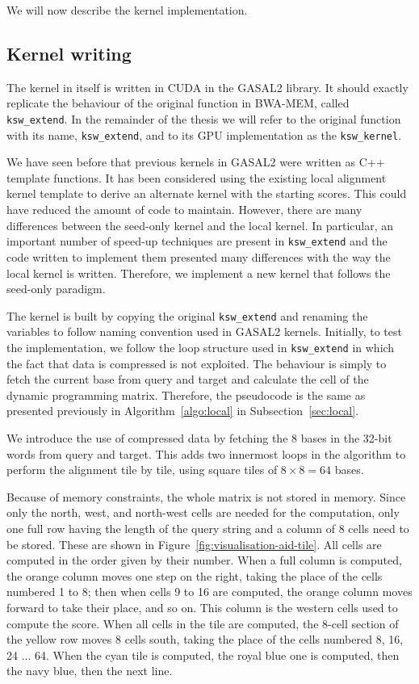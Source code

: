 We will now describe the kernel implementation.

\subsection{Kernel writing}
The kernel in itself is written in CUDA in the GASAL2 library. It should exactly replicate the behaviour of the original function in BWA-MEM, called \verb|ksw_extend|. In the remainder of the thesis we will refer to the original function with its name, \verb|ksw_extend|, and to its GPU implementation as the \verb|ksw_kernel|.

We have seen before that previous kernels in GASAL2 were written as C++ template functions. It has been considered using the existing local alignment kernel template to derive an alternate kernel with the starting scores. This could have reduced the amount of code to maintain. However, there are many differences between the seed-only kernel and the local kernel. In particular, an important number of speed-up techniques are present in \verb|ksw_extend| and the code written to implement them presented many differences with the way the local kernel is written. Therefore, we implement a new kernel that follows the seed-only paradigm.

The kernel is built by copying the original \verb|ksw_extend| and renaming the variables to follow naming convention used in GASAL2 kernels. Initially, to test the implementation, we follow the loop structure used in \verb|ksw_extend| in which the fact that data is compressed is not exploited. The behaviour is simply to fetch the current base from query and target and calculate the cell of the dynamic programming matrix. Therefore, the pseudocode is the same as presented previously in Algorithm~\ref{algo:local} in Subsection~\ref{sec:local}.

We introduce the use of compressed data by fetching the 8 bases in the 32-bit words from query and target. This adds two innermost loops in the algorithm to perform the alignment tile by tile, using square tiles of $8 \times 8 = 64$ bases.

Because of memory constraints, the whole matrix is not stored in memory. Since only the north, west, and north-west cells are needed for the computation, only one full row having the length of the query string and a column of 8 cells need to be stored. These are shown in Figure~\ref{fig:visualisation-aid-tile}. All cells are computed in the order given by their number. When a full column is computed, the orange column moves one step on the right, taking the place of the cells numbered 1 to 8; then when cells 9 to 16 are computed, the orange column moves forward to take their place, and so on. This column is the western cells used to compute the score. When all cells in the tile are computed, the 8-cell section of the yellow row moves 8 cells south, taking the place of the cells numbered 8, 16, 24 ... 64. When the cyan tile is computed, the royal blue one is computed, then the navy blue, then the next line.

